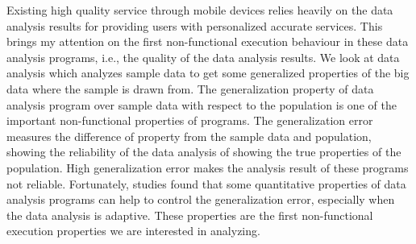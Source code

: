 Existing high quality
service through mobile devices relies heavily on the data analysis results
for providing users with personalized accurate services. This brings my attention on the
first non-functional execution behaviour in these data analysis programs, i.e., the quality of the data analysis results.
We look at data analysis which analyzes sample data to get some generalized properties of the big data where the sample is drawn from.
The generalization property of data analysis program over sample data with respect to the population is one of the important non-functional properties of programs.
The generalization error measures the difference of property from the sample data and population, showing the reliability of the data analysis of showing the true properties of the population. 
High generalization error makes the analysis result of these programs not reliable.
Fortunately, studies found that some quantitative properties of data analysis programs can help to control the generalization error, especially when the data analysis is adaptive.
These properties are the first non-functional execution properties we are interested in
analyzing.

